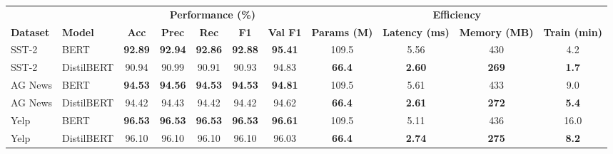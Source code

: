 \begin{tabular}{llccccccccc}
\toprule
\rowcolor{cabecera} &  & \multicolumn{5}{c}{\textbf{Performance (\%)}} & \multicolumn{4}{c}{\textbf{Efficiency}} \\
\cmidrule(lr){3-7}\cmidrule(lr){8-11}
\rowcolor{cabecera}\textbf{Dataset} & \textbf{Model} & \textbf{Acc} & \textbf{Prec} & \textbf{Rec} & \textbf{F1} & \textbf{Val F1} & \textbf{Params (M)} & \textbf{Latency (ms)} & \textbf{Memory (MB)} & \textbf{Train (min)} \\
\midrule
SST-2 & BERT & \textbf{92.89} & \textbf{92.94} & \textbf{92.86} & \textbf{92.88} & \textbf{95.41} & 109.5 & 5.56 & 430 & 4.2 \\
SST-2 & DistilBERT & 90.94 & 90.99 & 90.91 & 90.93 & 94.83 & \textbf{66.4} & \textbf{2.60} & \textbf{269} & \textbf{1.7} \\
\midrule
AG News & BERT & \textbf{94.53} & \textbf{94.56} & \textbf{94.53} & \textbf{94.53} & \textbf{94.81} & 109.5 & 5.61 & 433 & 9.0 \\
AG News & DistilBERT & 94.42 & 94.43 & 94.42 & 94.42 & 94.62 & \textbf{66.4} & \textbf{2.61} & \textbf{272} & \textbf{5.4} \\
\midrule
Yelp & BERT & \textbf{96.53} & \textbf{96.53} & \textbf{96.53} & \textbf{96.53} & \textbf{96.61} & 109.5 & 5.11 & 436 & 16.0 \\
Yelp & DistilBERT & 96.10 & 96.10 & 96.10 & 96.10 & 96.03 & \textbf{66.4} & \textbf{2.74} & \textbf{275} & \textbf{8.2} \\
\bottomrule
\end{tabular}
